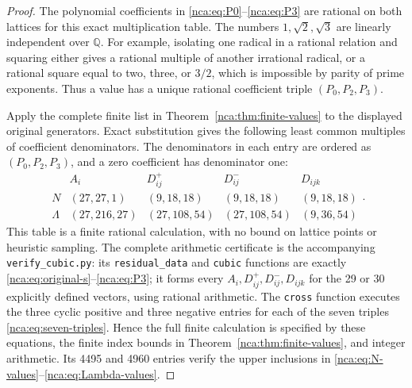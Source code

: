 \begin{proof}
The polynomial coefficients in
\eqref{nca:eq:P0}--\eqref{nca:eq:P3} are rational on both lattices
for this exact multiplication table.  The numbers
\(1,\sqrt2,\sqrt3\) are linearly independent over \(\mathbb Q\).
For example, isolating one radical in a rational relation and
squaring either gives a rational multiple of another irrational
radical, or a rational square equal to two, three, or \(3/2\),
which is impossible by parity of prime exponents. Thus a value has
a unique rational coefficient triple \((P_0,P_2,P_3)\).

Apply the complete finite list in
Theorem~\ref{nca:thm:finite-values} to the displayed original
generators. Exact substitution gives the following least common
multiples of coefficient denominators. The denominators in each
entry are ordered as \((P_0,P_2,P_3)\), and a zero coefficient has
denominator one:
\begin{equation}
\begin{array}{c|c|c|c|c}
 &A_i&D^+_{ij}&D^-_{ij}&D_{ijk}\\\hline
 N&(27,27,1)&(9,18,18)&(9,18,18)&(9,18,18)\\
 \Lambda&(27,216,27)&(27,108,54)&(27,108,54)&(9,36,54)
\end{array}.
\label{nca:eq:denominator-certificate}
\end{equation}
This table is a finite rational calculation, with no bound on
lattice points or heuristic sampling.  The complete arithmetic
certificate is the accompanying \texttt{verify\_cubic.py}: its
\texttt{residual\_data} and \texttt{cubic} functions are exactly
\eqref{nca:eq:original-s}--\eqref{nca:eq:P3}; it forms every
\(A_i,D^+_{ij},D^-_{ij},D_{ijk}\) for the 29 or 30 explicitly
defined vectors, using rational arithmetic.  The \texttt{cross}
function executes the three cyclic positive and three negative
entries for each of the seven triples
\eqref{nca:eq:seven-triples}.  Hence the full finite calculation
is specified by these equations, the finite index bounds in
Theorem~\ref{nca:thm:finite-values}, and integer arithmetic.
Its 4495 and 4960 entries verify the upper inclusions in
\eqref{nca:eq:N-values}--\eqref{nca:eq:Lambda-values}.


\end{proof}
